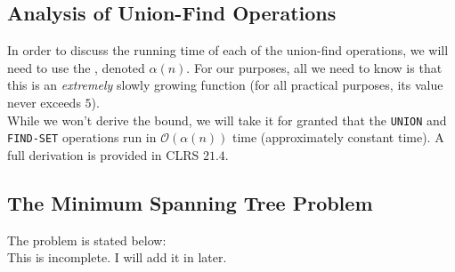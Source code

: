 \subsection{Analysis of Union-Find Operations}


In order to discuss the running time of each of the union-find operations, we will need to use the , denoted $\alpha(n)$. For our purposes, all we need to know is that this is an \textit{extremely} slowly growing function (for all practical purposes, its value never exceeds $5$). \\

While we won't derive the bound, we will take it for granted that the \verb!UNION! and \verb!FIND-SET! operations run in $\mathcal{O}(\alpha(n))$ time (approximately constant time). A full derivation is provided in CLRS $21.4$. 



\subsection{The Minimum Spanning Tree Problem}

The  problem is stated below: \\


This is incomplete. I will add it in later.

